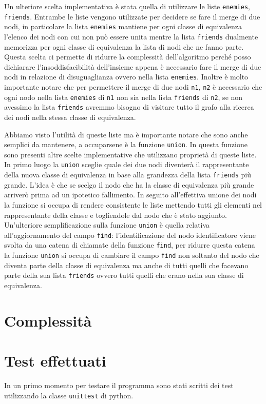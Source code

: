 \documentclass[a4paper, 11pt]{article}
\begin{document}
Un ulteriore scelta implementativa è stata quella di utilizzare le liste \verb|enemies|, \verb|friends|. Entrambe le liste vengono utilizzate per decidere se fare il merge di due nodi, in particolare la lista \verb|enemies| mantiene per ogni classe di equivalenza l'elenco dei nodi con cui non può essere unita mentre la lista \verb|friends| dualmente memorizza per ogni classe di equivalenza la lista di nodi che ne fanno parte. Questa scelta ci permette di ridurre la complessità dell'algoritmo perché posso dichiarare l'insoddisfacibilità dell'insieme appena è necessario fare il merge di due nodi in relazione di disuguaglianza ovvero nella lista \verb|enemies|. Inoltre è molto importante notare che per permettere il merge di due nodi \verb|n1|, \verb|n2| è necessario che ogni nodo nella lista \verb|enemies| di \verb|n1| non sia nella lista \verb|friends| di \verb|n2|, se non avessimo la lista \verb|friends| avremmo bisogno di visitare tutto il grafo alla ricerca dei nodi nella stessa classe di equivalenza.

Abbiamo visto l'utilità di queste liste ma è importante notare che sono anche semplici da mantenere, a occuparsene è la funzione \verb|union|. In questa funzione sono presenti altre scelte implementative che utilizzano proprietà di queste liste. In primo luogo la \verb|union| sceglie quale dei due nodi diventerà il rappresentante della nuova classe di equivalenza in base alla grandezza della lista \verb|friends| più grande. L'idea è che se scelgo il nodo che ha la classe di equivalenza più grande arriverò prima ad un ipotetico fallimento. In seguito all'effettiva unione dei nodi la funzione si occupa di rendere consistente le liste mettendo tutti gli elementi nel rappresentante della classe e togliendole dal nodo che è stato aggiunto. Un'ulteriore semplificazione sulla funzione \verb|union| è quella relativa all'aggiornamento del campo \verb|find|: l'identificazione del nodo identificatore viene svolta da una catena di chiamate della funzione \verb|find|, per ridurre questa catena la funzione \verb|union| si occupa di cambiare il campo \verb|find| non soltanto del nodo che diventa parte della classe di equivalenza ma anche di tutti quelli che facevano parte della sua lista \verb|friends| ovvero tutti quelli che erano nella sua classe di equivalenza.

\section*{Complessità}

\section*{Test effettuati}
In un primo momento per testare il programma sono stati scritti dei test utilizzando la classe \verb|unittest| di python.
\end{document}
